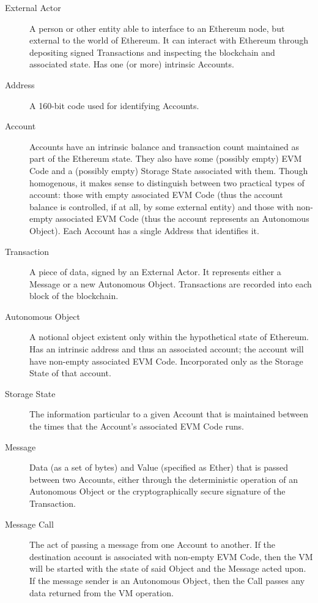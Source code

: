 \documentclass[9pt,oneside]{amsart}
\begin{document}
\begin{description}
\item[External Actor] A person or other entity able to interface to an Ethereum node, but external to the world of Ethereum. It can interact with Ethereum through depositing signed Transactions and inspecting the blockchain and associated state. Has one (or more) intrinsic Accounts.

\item[Address] A 160-bit code used for identifying Accounts.

\item[Account] Accounts have an intrinsic balance and transaction count maintained as part of the Ethereum state. They also have some (possibly empty) EVM Code and a (possibly empty) Storage State associated with them. Though homogenous, it makes sense to distinguish between two practical types of account: those with empty associated EVM Code (thus the account balance is controlled, if at all, by some external entity) and those with non-empty associated EVM Code (thus the account represents an Autonomous Object). Each Account has a single Address that identifies it.

\item[Transaction] A piece of data, signed by an External Actor. It represents either a Message or a new Autonomous Object. Transactions are recorded into each block of the blockchain.

\item[Autonomous Object] A notional object existent only within the hypothetical state of Ethereum. Has an intrinsic address and thus an associated account; the account will have non-empty associated EVM Code. Incorporated only as the Storage State of that account.

\item[Storage State] The information particular to a given Account that is maintained between the times that the Account's associated EVM Code runs.

\item[Message] Data (as a set of bytes) and Value (specified as Ether) that is passed between two Accounts, either through the deterministic operation of an Autonomous Object or the cryptographically secure signature of the Transaction.

\item[Message Call] The act of passing a message from one Account to another. If the destination account is associated with non-empty EVM Code, then the VM will be started with the state of said Object and the Message acted upon. If the message sender is an Autonomous Object, then the Call passes any data returned from the VM operation.


\end{description}
\end{document}
